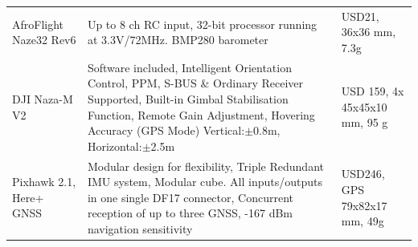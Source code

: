 \begin{table}[h]
\begin{tabularx}{\textwidth}{p{.12\linewidth} L  p{.13\textwidth}  }
\\ \hdashline
AfroFlight Naze32 Rev6                   & Up to 8 ch RC input, 32-bit processor running at 3.3V/72MHz. BMP280 barometer                                                                                                 & USD21,      36x36 mm,                                                                             7.3g  %
\\ \hdashline
DJI Naza-M V2                        & Software included,  Intelligent Orientation Control, PPM, S-BUS \& Ordinary Receiver Supported, Built-in Gimbal Stabilisation Function, Remote Gain Adjustment, Hovering Accuracy (GPS Mode) Vertical:$\pm$0.8m, Horizontal:$\pm$2.5m                                                & USD 159,   4x  45x45x10 mm, 95 g             
\\ \hdashline 
Pixhawk 2.1, Here+ GNSS                    & Modular design for flexibility, Triple Redundant IMU system, Modular cube. All inputs/outputs in one single DF17 connector, Concurrent reception of up to three GNSS, -167 dBm navigation sensitivity                                                                                                                                        & USD246, GPS 79x82x17 mm, 49g                                  %
\\ \bottomrule
    \end{tabularx}
\end{table}

